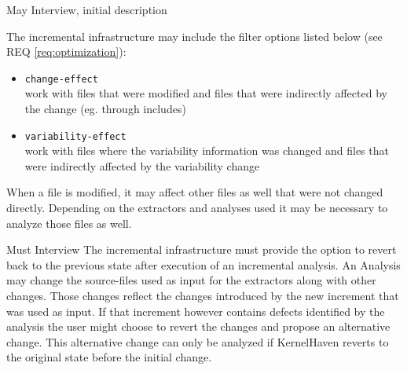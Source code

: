 \documentclass[a4paper]{article}
\begin{document}
\begin{req}
\begin{subreq} \label{req:effect-filters}
    \reqtable
	{May}  {Interview, initial description}
	{
	The incremental infrastructure may include the filter options listed below (see REQ \ref{req:optimization}):
	\begin{itemize}
		\item \texttt{change-effect} \\
		work with files that were modified and files that were indirectly affected by the change (eg. through includes)
	    \item \texttt{variability-effect}  \\
	    work with files where the variability information was changed and files that were indirectly affected by the variability change
	\end{itemize}
    }
	{When a file is modified, it may affect other files as well that were not changed directly. Depending on the extractors and analyses used it may be necessary to analyze those files as well.}
\end{subreq}

\end{req}
\vspace{1em}

\begin{req} \label{req:rollback}
\reqtable
	{Must}  {Interview}
	{The incremental infrastructure must provide the option to revert back to the previous state after execution of an incremental analysis.}
	{An Analysis may change the source-files used as input for the extractors along with other changes. Those changes reflect the changes introduced by the new increment that was used as input. If that increment however contains defects identified by the analysis the user might choose to revert the changes and propose an alternative change. This alternative change can only be analyzed if KernelHaven reverts to the original state before the initial change.}

\end{req}
\vspace{1em}
\end{document}
